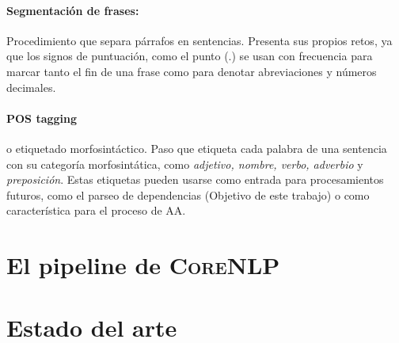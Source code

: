 \paragraph{Segmentación de frases:}Procedimiento que separa párrafos en
sentencias. Presenta sus propios retos, ya que los signos de puntuación, como el
punto (.) se usan con frecuencia para marcar tanto el fin de una frase como para
denotar abreviaciones y números decimales.

\paragraph{POS tagging} o etiquetado morfosintáctico. Paso que etiqueta cada
palabra de una sentencia con su categoría morfosintática, como \emph{adjetivo,
  nombre, verbo, adverbio} y \emph{preposición}. Estas etiquetas pueden usarse
como entrada para procesamientos futuros, como el parseo de dependencias
(Objetivo de este trabajo) o como característica para el proceso de \ac{AA}.

\section{El pipeline de \textsc{CoreNLP}}
\label{sec:corenlppipeline}

\section{Estado del arte}
\label{sec:stateoftheart}



